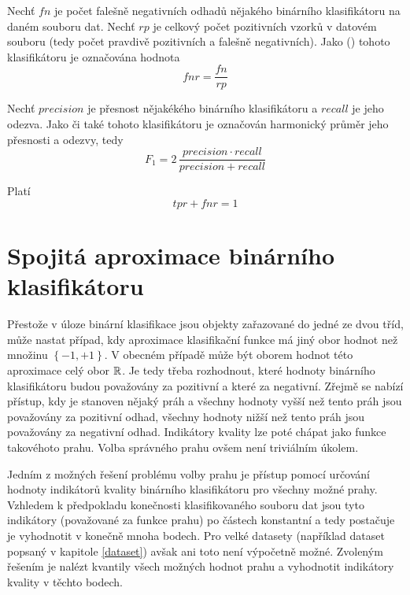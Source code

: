 \begin{define}
	Nechť \( fn \) je počet falešně negativních odhadů nějakého binárního klasifikátoru na daném souboru dat. Nechť \( rp \) je celkový počet pozitivních vzorků v datovém souboru (tedy počet pravdivě pozitivních a falešně negativních). Jako  () tohoto klasifikátoru je označována hodnota
	\[ fnr = \frac{fn}{rp} \]
\end{define}

\begin{define}
	Nechť \( precision \) je přesnost nějakékého binárního klasifikátoru a \( recall \) je jeho odezva. Jako  či také  tohoto klasifikátoru je označován harmonický průměr jeho přesnosti a odezvy, tedy
	\[ F_1 = 2 \, \frac{precision \cdot recall}{precision + recall} \]
\end{define}

\begin{theorem}\label{tpr+fnr}
	Platí
	\[ tpr + fnr = 1 \]
\end{theorem}

\section{Spojitá aproximace binárního klasifikátoru}\label{continuous_aprox}

Přestože v úloze binární klasifikace jsou objekty zařazované do jedné ze dvou tříd, může nastat případ, kdy aproximace klasifikační funkce má jiný obor hodnot než množinu \( \left\{ -1, +1 \right\} \). V obecném případě může být oborem hodnot této aproximace celý obor \( \mathbb R \). Je tedy třeba rozhodnout, které hodnoty binárního klasifikátoru budou považovány za pozitivní a které za negativní. Zřejmě se nabízí přístup, kdy je stanoven nějaký práh a všechny hodnoty vyšší než tento práh jsou považovány za pozitivní odhad, všechny hodnoty nižší než tento práh jsou považovány za negativní odhad. Indikátory kvality lze poté chápat jako funkce takovéhoto prahu. Volba správného prahu ovšem není triviálním úkolem.

Jedním z možných řešení problému volby prahu je přístup pomocí určování hodnoty indikátorů kvality binárního klasifikátoru pro všechny možné prahy. Vzhledem k předpokladu konečnosti klasifikovaného souboru dat jsou tyto indikátory (považované za funkce prahu) po částech konstantní a tedy postačuje je vyhodnotit v konečně mnoha bodech. Pro velké datasety (například dataset popsaný v kapitole \ref{dataset}) avšak ani toto není výpočetně možné. Zvoleným řešením je nalézt kvantily všech možných hodnot prahu a vyhodnotit indikátory kvality v těchto bodech.

